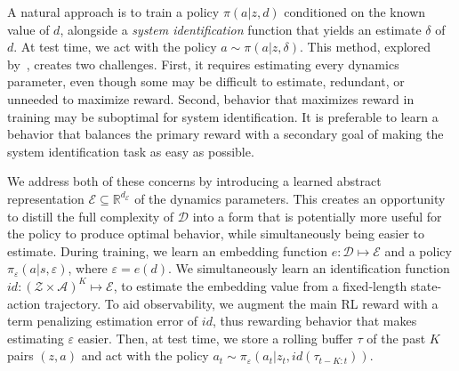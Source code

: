 \documentclass{article}
\newcommand{\R}{\mathbb{R}}
\newcommand{\cA}{\mathcal{A}}
\newcommand{\sysid}{dynamics}
\newcommand{\embedfn}{e}
\newcommand{\idfn}{id}
\newcommand{\obset}{\mathcal{Z}}
\newcommand{\idset}{\mathcal{D}}
\newcommand{\obvar}{z}
\newcommand{\idvar}{d}
\newcommand{\latset}{\mathcal{E}}
\newcommand{\latvar}{\varepsilon}
\newcommand{\secref}[1]{Section \ref{#1}}
\begin{document}
A natural approach is to train a policy $\pi(a|\obvar,\idvar)$ conditioned on the known value of $\idvar$,
alongside a \emph{system identification} function that yields an estimate $\delta$ of $\idvar$.
At test time, we act with the policy $a \sim \pi(a|\obvar, \delta)$.
This method, explored by~\citet{yu-up-osi-rss17}, creates two challenges.
First, it requires estimating every \sysid{} parameter,
even though some may be difficult to estimate, redundant, or unneeded to maximize reward. %
Second, behavior that maximizes reward %
in training may be suboptimal for system identification.
It is preferable to learn a behavior that balances the primary reward %
with a secondary goal of making the system identification task as easy as possible. %

We address both of these concerns by introducing
a learned abstract representation
$\latset \subseteq \R^{d_\latset}$
of the \sysid{} parameters.
This creates an opportunity to distill the full complexity of $\idset$
into a form that is potentially more useful for the policy to produce optimal behavior,
while simultaneously being easier to estimate.
During training, we learn an embedding function $\embedfn : \idset \mapsto \latset$
and a policy $\pi_\latvar(a|s,\latvar)$, where $\latvar = \embedfn(\idvar)$.
We simultaneously learn an identification function $\idfn : (\obset \times \cA)^K \mapsto \latset$,
to estimate the embedding value from a fixed-length state-action trajectory.
To aid observability, we augment the main RL reward with a term penalizing estimation error of $\idfn$,
thus rewarding behavior that makes estimating $\latvar$ easier.
Then, at test time, we store a rolling buffer $\tau$ of the past $K$ pairs $(\obvar,a)$
and act with the policy $a_t \sim \pi_\latvar(a_t|\obvar_t, \idfn(\tau_{t-K:t}))$.
\end{document}
